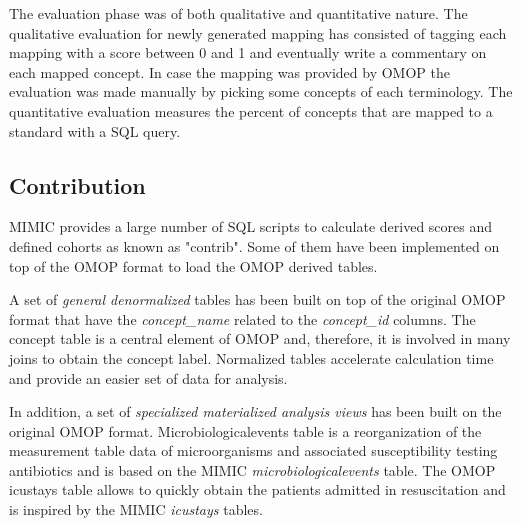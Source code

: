 The evaluation phase was of both qualitative and quantitative nature.
The qualitative evaluation for newly generated mapping has consisted of tagging
each mapping with a score between 0 and 1 and eventually write a commentary on
each mapped concept. In case the mapping was provided by OMOP the evaluation
was made manually by picking some concepts of each terminology.
The quantitative evaluation measures the percent of concepts that are mapped to
a standard with a SQL query.

%
%
\subsection{Contribution}

MIMIC provides a large number of SQL scripts to calculate derived scores and
defined cohorts as known as "contrib". Some of them have been implemented on
top of the OMOP format to load the OMOP derived tables. 

A set of \emph{general denormalized} tables has been built on top of the original 
OMOP  format that have the \textit{concept\_name} related to the \textit{concept\_id} 
columns. The concept table is a central element of OMOP and, therefore, it is 
involved in many joins to obtain the concept label. Normalized tables accelerate 
calculation time and provide an easier set of data for analysis.

In addition, a set of \emph{specialized materialized analysis views} has been built 
on the original OMOP format. Microbiologicalevents table is a reorganization of the 
measurement table data of microorganisms and associated susceptibility testing 
antibiotics and is based on the MIMIC \textit{microbiologicalevents} table. 
The OMOP icustays table allows to quickly obtain the patients admitted in 
resuscitation and is inspired by the MIMIC \textit{icustays} tables.

